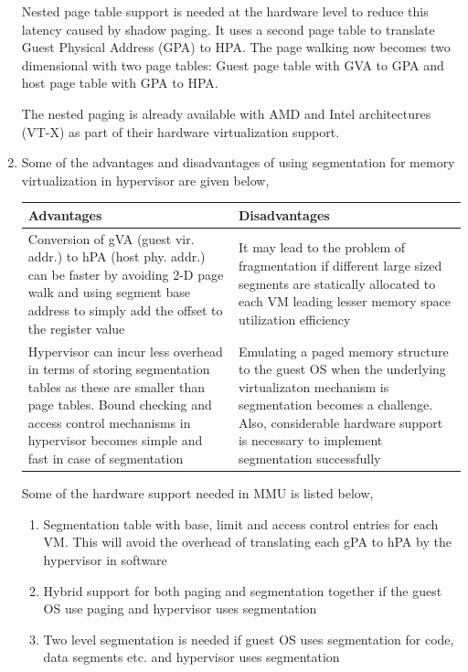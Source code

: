 \documentclass[11pt,a4paper,oneside]{article}
\begin{document}
\begin{enumerate}
 		Nested page table support is needed at the hardware level to reduce this latency caused by shadow paging. It uses a second page table to translate Guest Physical Address (GPA) to HPA. The page walking now becomes two dimensional with two page tables: Guest page table with GVA to GPA and host page table with GPA to HPA. 
 		
 		The nested paging is already available with AMD and Intel architectures (VT-X) as part of their hardware virtualization support.
 		
		\item Some of the advantages and disadvantages of using segmentation for memory virtualization in hypervisor are given below,
		\begin{center}
			\begin{tabular}{|p{6.5cm}|p{6.5cm}|}
				\hline 
				\textbf{Advantages}  & \textbf{Disadvantages} \\
				\hline
				Conversion of gVA (guest vir. addr.) to hPA (host phy. addr.) can be faster by avoiding 2-D page walk and using segment base address to simply add the offset to the register value & It may lead to the problem of fragmentation if different large sized segments are statically allocated to each VM leading lesser memory space utilization efficiency\\
				\hline
				Hypervisor can incur less overhead in terms of storing segmentation tables as these are smaller than page tables. Bound checking and access control mechanisms in hypervisor becomes simple and fast in case of segmentation &  Emulating a paged memory structure to the guest OS when the underlying virtualizaton mechanism is segmentation becomes a challenge. Also, considerable hardware support is necessary to implement segmentation successfully\\
				\hline
				\end{tabular}
		\end{center}
	    Some of the hardware support needed in MMU is listed below,
	    \begin{enumerate}
	    	\item Segmentation table with base, limit and access control entries for each VM. This will avoid the overhead of translating each gPA to hPA by the hypervisor in software
	    	\item Hybrid support for both paging and segmentation together if the guest OS use paging and hypervisor uses segmentation
	    	\item Two level segmentation is needed if guest OS uses segmentation for code, data segments etc. and hypervisor uses segmentation
	    \end{enumerate}
		

\end{enumerate}
\end{document}
